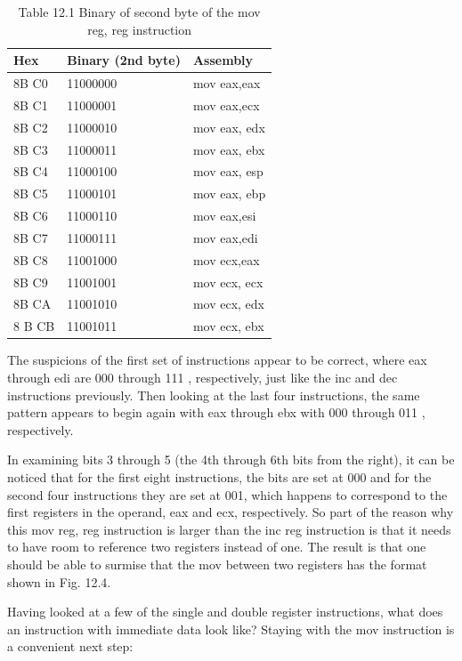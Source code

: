 \documentclass[10pt]{book}
\begin{document}
\begin{table}[htbp]
\begin{center}
\captionsetup{labelformat=empty}
\caption{Table 12.1 Binary of second byte of the mov reg, reg instruction}
\begin{tabular}{|l|l|l|}
\hline
Hex & Binary (2nd byte) & Assembly \\
\hline
8B C0 & 11000000 & mov eax,eax \\
\hline
8B C1 & 11000001 & mov eax,ecx \\
\hline
8B C2 & 11000010 & mov eax, edx \\
\hline
8B C3 & 11000011 & mov eax, ebx \\
\hline
8B C4 & 11000100 & mov eax, esp \\
\hline
8B C5 & 11000101 & mov eax, ebp \\
\hline
8B C6 & 11000110 & mov eax,esi \\
\hline
8B C7 & 11000111 & mov eax,edi \\
\hline
8B C8 & 11001000 & mov ecx,eax \\
\hline
8B C9 & 11001001 & mov ecx, ecx \\
\hline
8B CA & 11001010 & mov ecx, edx \\
\hline
8 B CB & 11001011 & mov ecx, ebx \\
\hline
\end{tabular}
\end{center}
\end{table}

The suspicions of the first set of instructions appear to be correct, where eax through edi are 000 through 111 , respectively, just like the inc and dec instructions previously. Then looking at the last four instructions, the same pattern appears to begin again with eax through ebx with 000 through 011 , respectively.

In examining bits 3 through 5 (the 4th through 6th bits from the right), it can be noticed that for the first eight instructions, the bits are set at 000 and for the second four instructions they are set at 001, which happens to correspond to the first registers in the operand, eax and ecx, respectively. So part of the reason why this mov reg, reg instruction is larger than the inc reg instruction is that it needs to have room to reference two registers instead of one. The result is that one should be able to surmise that the mov between two registers has the format shown in Fig. 12.4.

Having looked at a few of the single and double register instructions, what does an instruction with immediate data look like? Staying with the mov instruction is a convenient next step:
\end{document}
